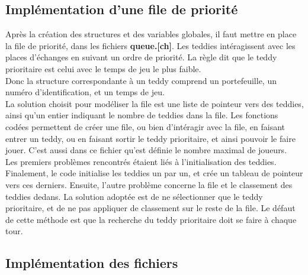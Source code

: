 \documentclass{article}
\begin{document}
\vspace*{10mm}

\subsection{Impl\'ementation d'une file de priorit\'e}
Apr\`es la cr\'eation des structures et des variables globales, il faut mettre en place la file de priorit\'e, dans les fichiers \textbf{queue.[ch]}. Les teddies int\'eragissent avec les places d'\'echanges en suivant un ordre de priorit\'e. La r\`egle dit que le teddy prioritaire est celui avec le temps de jeu le plus faible.\\ 
Donc la structure correspondante \`a un teddy comprend un portefeuille, un num\'ero d'identification, et un temps de jeu.\\ 

La solution choisit pour mod\'eliser la file est une liste de pointeur vers des teddies, ainsi qu'un entier indiquant le nombre de teddies dans la file. 
Les fonctions cod\'ees permettent de cr\'eer une file, ou bien d'int\'eragir avec la file, en faisant entrer un teddy, ou en faisant sortir le teddy prioritaire, et ainsi pouvoir le faire jouer. 
C'est aussi dans ce fichier qu'est d\'efinie le nombre maximal de joueurs.\\

Les premiers probl\`emes rencontr\'es \'etaient li\'es \`a l'initialisation des teddies. Finalement, le code initialise les teddies un par un, et cr\'ee un tableau de pointeur vers ces derniers.
Ensuite, l'autre probl\`eme concerne la file et le classement des teddies dedans.
La solution adopt\'ee est de ne s\'electionner que le teddy prioritaire, et de ne pas appliquer de classement sur le reste de la file. Le d\'efaut de cette m\'ethode est que la recherche du teddy prioritaire doit se faire \`a chaque tour.  


\subsection{Impl\'ementation des fichiers}
\end{document}
